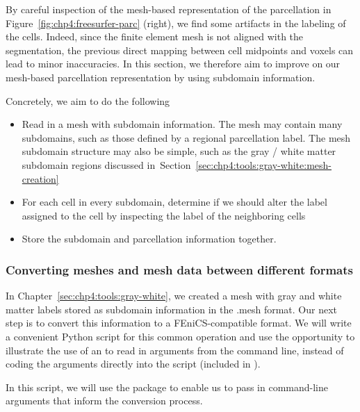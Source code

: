 By careful inspection of the mesh-based representation of the
parcellation in Figure~\ref{fig:chp4:freesurfer-parc} (right), we find
some artifacts in the labeling of the cells. Indeed, since the finite
element mesh is not aligned with the segmentation, the previous direct
mapping between cell midpoints and voxels can lead to minor
inaccuracies. In this section, we therefore aim to improve on our mesh-based
parcellation representation by using subdomain
information. 


Concretely, we aim to do the following
\begin{itemize}
\item
  Read in a mesh with subdomain information.  The mesh may contain many 
  subdomains, such as those defined by a regional parcellation label.  The 
  mesh subdomain structure may also be simple, such as the gray / white matter
  subdomain regions discussed in~Section~\ref{sec:chp4:tools:gray-white:mesh-creation} 
\item
  For each cell in every subdomain, determine if we should alter the label 
  assigned to the cell by inspecting the label of the neighboring cells 
\item
  Store the subdomain and parcellation information together.
\end{itemize}

\subsubsection*{Converting meshes and mesh data between different formats} 
\label{chp4:meshio-converting}

In Chapter~\ref{sec:chp4:tools:gray-white}, we created a mesh with
gray and white matter labels stored as subdomain information in the
.mesh format. Our next step is to convert this information to a
FEniCS-compatible format. We will write a convenient Python script for this
common operation and use the opportunity to illustrate the use of an
 to read in arguments from the command
line, instead of coding the arguments directly into the script
(included in ).

In this script, we will use the  package to enable us to pass in 
command-line arguments that inform the conversion process.

